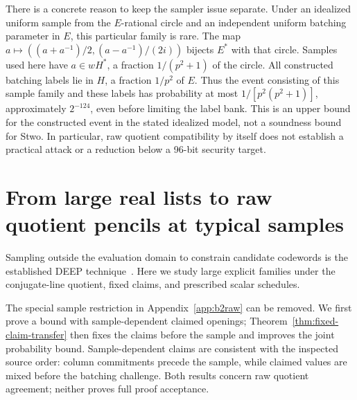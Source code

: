 \documentclass[11pt,letterpaper]{article}
\theoremstyle{definition}
\theoremstyle{remark}
\begin{document}
There is a concrete reason to keep the sampler issue separate.
Under an idealized uniform sample from the $E$-rational circle and an
independent uniform batching parameter in $E$, this particular family
is rare. The map $a\mapsto((a+a^{-1})/2,(a-a^{-1})/(2i))$ bijects
$E^*$ with that circle. Samples used here have $a\in wH^*$, a fraction
$1/(p^2+1)$ of the circle. All constructed batching labels lie in $H$,
a fraction $1/p^2$ of $E$. Thus the event consisting of this sample
family and these labels has probability at most
$1/[p^2(p^2+1)]$, approximately $2^{-124}$, even before limiting the
label bank. This is an upper bound for the constructed event in the
stated idealized model, not a soundness bound for Stwo. In particular,
raw quotient compatibility by itself does not establish a practical
attack or a reduction below a 96-bit security target.

\section{From large real lists to raw quotient pencils at typical samples}
\label{app:generic-quotient}
Sampling outside the evaluation domain to constrain candidate codewords
is the established DEEP technique~\cite{deepfri}. Here we study large
explicit families under the conjugate-line quotient, fixed claims, and
prescribed scalar schedules.

The special sample restriction in Appendix~\ref{app:b2raw} can be
removed. We first prove a bound with sample-dependent claimed openings;
Theorem~\ref{thm:fixed-claim-transfer} then fixes the claims before the
sample and improves the joint probability bound. Sample-dependent claims
are consistent with the inspected source order: column commitments
precede the sample, while claimed values are mixed before the batching
challenge. Both results concern raw quotient agreement; neither proves
full proof acceptance.
\end{document}
